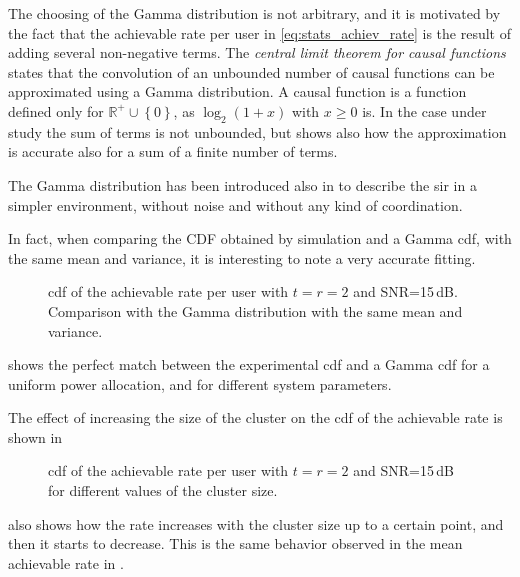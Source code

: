 The choosing of the Gamma distribution is not arbitrary, and it is motivated by
the fact that the achievable rate per user in \eqref{eq:stats_achiev_rate} is
the result of adding several non-negative terms. The \emph{central limit theorem
for causal functions} \cite{papoulis_fourier} states that the convolution of an
unbounded number of causal functions can be approximated using a Gamma
distribution. A causal function is a function defined only for $\mathbb{R}^{+}
\cup \left\{0\right\}$, as $\log_2\left(1+x\right)$ with $x \geq 0$ is. In the
case under study the sum of terms is not unbounded, but \cite{papoulis_fourier}
shows also how the approximation is accurate also for a sum of a finite number
of terms.

The Gamma distribution has been introduced also in \cite{cheikh11} to describe
the \gls{sir} in a simpler environment, without noise and without any kind of
coordination.

In fact, when comparing the CDF obtained by simulation and a Gamma \gls{cdf},
with the same mean and variance, it is interesting to note a very accurate
fitting.

\begin{figure}[t]
\begin{center}
   \dummybox
\end{center}
\caption{\gls{cdf} of the achievable rate per user with $t=r=2$ and
SNR=15\,dB. Comparison with the Gamma distribution with the same mean and
variance.}
\label{fig:cdf_sim_analy}
\end{figure}

 shows the perfect match between the experimental
\gls{cdf} and a Gamma \gls{cdf} for a uniform power allocation, and for
different system parameters.

The effect of increasing the size of the cluster on the \gls{cdf} of the
achievable rate is shown in 

\begin{figure}[t]
\begin{center}
   \dummybox
\end{center}
\caption{\gls{cdf} of the achievable rate per user with $t=r=2$ and
SNR=15\,dB for different values of the cluster size.}
\label{fig:cdf_cluster_size}
\end{figure}

 also shows how the rate increases with the cluster
size up to a certain point, and then it starts to decrease. This is the same
behavior observed in the mean achievable rate in .

